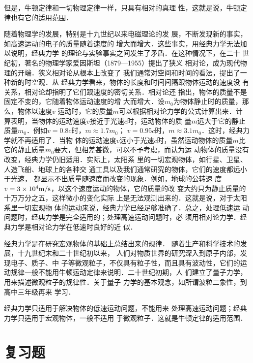     但是，牛顿定律和一切物理定律一样，只具有相对的真理
性，这就是说，牛顿定律也有它的适用范围．

    随着物理学的发展，特别是十九世纪以来电磁理论的发
展，不断发现新的事实，如高速运动的电子的质量随着速度的
增大而增大．这些事实，用经典力学无法加以说明，经典力学
的理论与实验事实之间发生了矛盾．在这种情况下，在二十
世纪初，著名的物理学家爱因斯坦（1879—1955）提出了狭义
相对论，成为现代物理的开端．狭义相对论从根本上改变了
我们通常对空间和时间的看法，提出了一种新的时空观．从
经典力学看来，物体的长度和时间间隔跟物体运动的速度没
有关系，相对论却指明了它们跟速度的密切关系．相对论还
指出，物体的质量不是固定不变的，它随着物体运动速度的增
大而增大．设$m_0$为物体静止时的质量，那么，物体以速度$v$
运动时，它的质量$m$可以根据相对论力学的公式计算出来．计
算表明，当物体的运动速度$v$接近于光速$c$时，运动物体的质
量$m$远大于它的静止质量$m_0$．例如$v=0.8c$时，$m\approx 1.7m_0$；
$v=0.95c$时，$m\approx 3.1m_0$．这时，经典力学就不再适用了．当物
体的运动速度$v$远小于光速$c$时，虽然运动物体的质量$m$比
它的静止质量$m_0$要大，但相差甚微，可以不予考虑，而认为运
动物体的质量没有改变，经典力学仍旧适用．实际上，太阳系
里的一切宏观物体，如行星、卫星、人造飞船、地球上的各种交
通工具以及我们通常研究的物体，它们的速度都远小于光速，
都显示不出质量随速度而改变的现象．例如，地球的公转速
度$v=3\times 10^4\text{m}/\text{s}$，以这个速度运动的物体，它的质量的改
变大约只为静止质量的十万万分之五，这样微小的变化实际
上是无法观测出来的．这就是说，对于太阳系里一切宏观物
体的运动来说，经典力学已经足够准确了．总之，处理低速运
动问题时，经典力学是完全适用的；处理高速运动问题时，必
须用相对论力学．经典力学是相对论力学在低速时良好的近
似．

    经典力学是在研究宏观物体的基础上总结出来的规律．
随着生产和科学技术的发展，十九世纪末和二十世纪初以来，
人们对物质世界的研究深入到原子内部，发现电子、质子、中
子等微观粒子，不仅具有粒子性，而且具有波动性，它们的运
动规律一般不能用牛顿运动定律来说明．二十世纪初期，人
们建立了量子力学，用来描述微观粒子的规律性．关于量子
力学的基本观念，如所谓波粒二象性，到高中三年级再来
学习．

经典力学只适用于解决物体的低速运动问题，不能用来
处理高速运动问题；经典力学只适用于宏观物体，一般不适用
于微观粒子．这就是牛顿定律的适用范围．

\section*{复习题}

